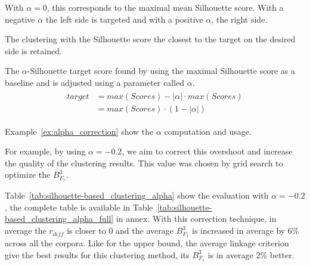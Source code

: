 With $\alpha = 0$, this corresponds to the maximal mean Silhouette score.
With a negative $\alpha$ the left side is targeted and with a positive $\alpha$, the right side.

The clustering with the Silhouette score the closest to the target on the desired side is retained.

\begin{definition}
  The $\alpha$-Silhouette target score found by using the maximal Silhouette score as a baseline and is adjusted using a parameter called $\alpha$.
  \begin{gather*}
    \begin{aligned}
    target &= max(Scores) - |\alpha| \cdot max(Scores) \\
           &= max(Scores) \cdot (1 - |\alpha|)
    \end{aligned}
  \end{gather*}
\end{definition}

Example~\ref{ex:alpha_correction} show the $\alpha$ computation and usage.

For example, by using $\alpha = -0.2$, we aim to correct this overshoot and increase the quality of the clustering results.
This value was chosen by grid search to optimize the $B^3_{F_1}$.

Table~\ref{tab:silhouette-based_clustering_alpha} show the evaluation with $\alpha = -0.2$, the complete table is available in Table~\ref{tab:silhouette-based_clustering_alpha_full} in annex.
With this correction technique, in average the $r_{diff}$ is closer to 0 and the average $B^3_{F_1}$ is increased in average by 6\% across all the corpora.
Like for the upper bound, the average linkage criterion give the best results for this clustering method, its $B^3_{F_1}$ is in average 2\% better.

